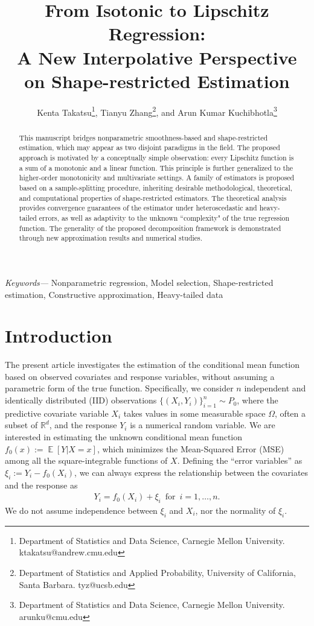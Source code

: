 \documentclass[12pt]{article}
\title{\Large From Isotonic to Lipschitz Regression:\\
A New Interpolative Perspective on Shape-restricted Estimation}
\author{Kenta Takatsu\thanks{Department of Statistics and Data Science, Carnegie Mellon University. ktakatsu@andrew.cmu.edu}, 
Tianyu Zhang\thanks{Department of Statistics and Applied Probability, University of California, Santa Barbara. tyz@ucsb.edu}, 
and Arun Kumar Kuchibhotla\thanks{Department of Statistics and Data Science, Carnegie Mellon University. arunku@cmu.edu}}
\date{}
\DeclareMathOperator*{\E}{\mathbb{E}}
\providecommand{\keywords}[1]
{
  \small{\textit{Keywords---} #1}
}
\begin{document}
\maketitle
\begin{abstract}
This manuscript bridges nonparametric smoothness-based and shape-restricted estimation, which may appear as two disjoint paradigms in the field. The proposed approach is motivated by a conceptually simple observation: every Lipschitz function is a sum of a monotonic and a linear function. This principle is further generalized to the higher-order monotonicity and multivariate settings. A family of estimators is proposed based on a sample-splitting procedure, inheriting desirable methodological, theoretical, and computational properties of shape-restricted estimators. The theoretical analysis provides convergence guarantees of the estimator under heteroscedastic and heavy-tailed errors, as well as adaptivity to the unknown ``complexity" of the true regression function. The generality of the proposed decomposition framework is demonstrated through new approximation results and numerical studies.
\end{abstract}
\keywords{Nonparametric regression, Model selection, Shape-restricted estimation, Constructive approximation, Heavy-tailed data}

\newpage

\newpage
\section{Introduction}
The present article investigates the estimation of the conditional mean function based on observed covariates and response variables, without assuming a parametric form of the true function. Specifically, we consider $n$ independent and identically distributed (IID) observations $\{(X_i, Y_i)\}_{i=1}^n \sim P_0$, where the predictive covariate variable $X_i$ takes values in some measurable space $\Omega$, often a subset of $\mathbb{R}^d$, and the response $Y_i$ is a numerical random variable. We are interested in estimating the unknown conditional mean function $f_0(x):= \E[Y|X=x]$, which minimizes the Mean-Squared Error (MSE) among all the square-integrable functions of $X$. Defining the ``error variables'' as $\xi_i:= Y_i - f_0(X_i)$, we can always express the relationship between the covariates and the response as
\begin{align}\label{eq:regression-function}
    Y_i = f_0(X_i) + \xi_i \, \text{ for }\, i = 1, \dots, n.
\end{align}
We do not assume independence between $\xi_i$ and $X_i$, nor the normality of $\xi_i$. 
\end{document}

